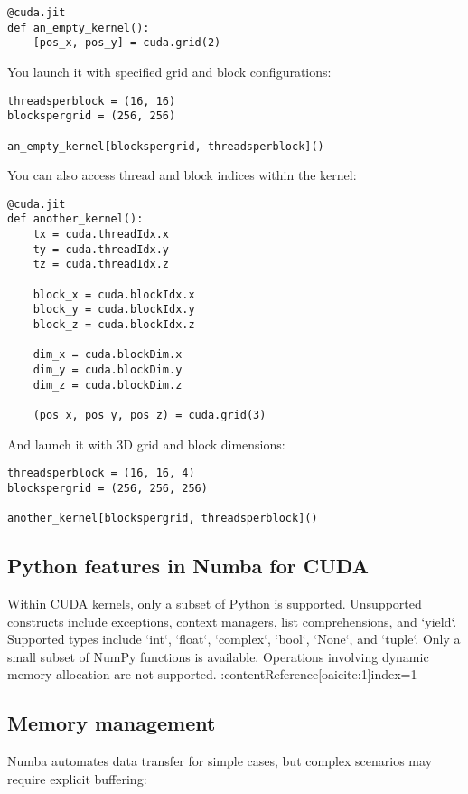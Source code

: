 \documentclass[11pt,a4paper]{book}
\begin{document}
\begin{lstlisting}
@cuda.jit
def an_empty_kernel():
    [pos_x, pos_y] = cuda.grid(2)
\end{lstlisting}

You launch it with specified grid and block configurations:

\begin{lstlisting}
threadsperblock = (16, 16)
blockspergrid = (256, 256)

an_empty_kernel[blockspergrid, threadsperblock]()
\end{lstlisting}

You can also access thread and block indices within the kernel:

\begin{lstlisting}
@cuda.jit
def another_kernel():
    tx = cuda.threadIdx.x
    ty = cuda.threadIdx.y
    tz = cuda.threadIdx.z

    block_x = cuda.blockIdx.x
    block_y = cuda.blockIdx.y
    block_z = cuda.blockIdx.z

    dim_x = cuda.blockDim.x
    dim_y = cuda.blockDim.y
    dim_z = cuda.blockDim.z

    (pos_x, pos_y, pos_z) = cuda.grid(3)
\end{lstlisting}

And launch it with 3D grid and block dimensions:

\begin{lstlisting}
threadsperblock = (16, 16, 4)
blockspergrid = (256, 256, 256)

another_kernel[blockspergrid, threadsperblock]()
\end{lstlisting}

\subsection*{Python features in Numba for CUDA}
Within CUDA kernels, only a subset of Python is supported. Unsupported constructs include exceptions, context managers, list comprehensions, and `yield`. Supported types include `int`, `float`, `complex`, `bool`, `None`, and `tuple`. Only a small subset of NumPy functions is available. Operations involving dynamic memory allocation are not supported. :contentReference[oaicite:1]{index=1}

\subsection*{Memory management}
Numba automates data transfer for simple cases, but complex scenarios may require explicit buffering:
\end{document}
